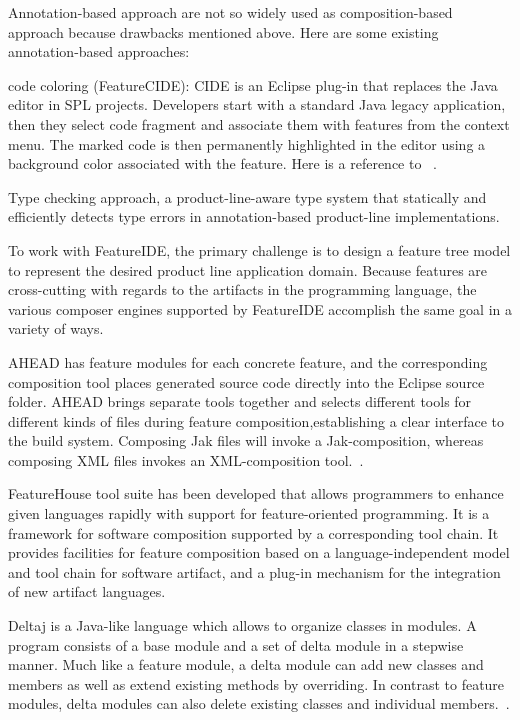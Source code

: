 Annotation-based approach are not so widely used as composition-based approach because drawbacks mentioned above.
Here are some existing annotation-based approaches:

code coloring (FeatureCIDE): CIDE is an Eclipse plug-in that replaces the Java editor in SPL projects. Developers
start with a standard Java legacy application, then they select code fragment and associate them with features
 from the context menu. The marked code is then permanently highlighted in the editor using a background color
 associated with the feature. Here is a reference to ~\cite{CIDE:Eclipse}.


Type checking approach,  a product-line-aware type system that statically and efficiently detects type errors in
annotation-based product-line implementations.


To work with FeatureIDE, the primary challenge is to design a feature tree model to represent the desired product
line application domain. Because features are cross-cutting with regards to the artifacts in the programming
language, the various composer engines supported by FeatureIDE accomplish the same goal in a variety of ways.

AHEAD has feature modules for each concrete feature, and the corresponding composition tool places generated
source code directly into the Eclipse source folder. AHEAD brings separate tools together and selects different
tools for different kinds of files during feature composition,establishing a clear interface to the build
system. Composing Jak files will invoke a Jak-composition, whereas composing XML files invokes an
XML-composition tool.~\cite{Batory2004FeatureorientedPA}.

FeatureHouse tool suite has been developed that allows programmers to enhance given languages rapidly with
support for feature-oriented programming. It is a framework for software composition supported by a
corresponding tool chain. It provides facilities for feature  composition based on a language-independent
model and tool chain for software artifact, and a plug-in mechanism for the integration of new artifact
languages.~\cite{Apel:2009:FLA:1555001.1555038}

Deltaj is a Java-like language which allows to organize classes in modules. A program consists of a base
 module and a set of delta module in a stepwise manner. Much like a feature module, a delta module can add
 new classes and members as well as extend existing methods by overriding. In contrast to feature modules,
 delta modules can also delete existing classes and individual members.~\cite{Schaefer:2010:DPS:1885639.1885647}.

